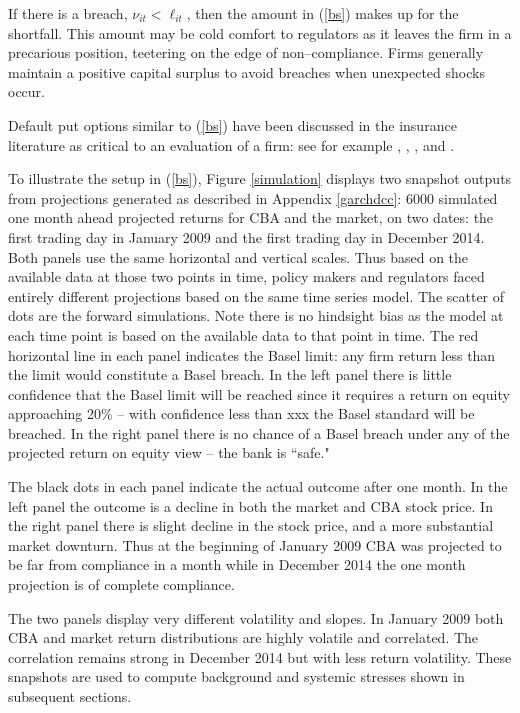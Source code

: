 \documentclass[12pt]{article}
\newcommand{\eref}[1]{(\ref{#1})}
\newcommand{\fref}[1]{Figure \ref{#1}}
\newcommand{\aref}[1]{Appendix \ref{#1}}
\begin{document}
If there is a breach, $\nu_{it}<\ell_{it}$, then the amount in \eref{bs} makes up for the shortfall.   This amount may be cold comfort to regulators as it leaves the firm in a precarious position, teetering on the edge of non--compliance. Firms generally maintain a positive capital surplus to avoid breaches when unexpected shocks occur.

Default put options similar to \eref{bs} have been discussed in the insurance literature as critical to an evaluation of a firm:  see for
example \citet{merton1977analytic}, \citet{doherty1986price}, \citet{cummins1988risk}, \citet{myers2001capital} and \citet{sherris2006solvency}.

To illustrate the setup in \eref{bs}, \fref{simulation}   displays two snapshot outputs from projections generated as described  in \aref{garchdcc}:  6000  simulated one month ahead projected returns for  CBA and the market, on  two dates: the first trading day in January 2009 and the first trading day in December 2014.    Both panels use the same horizontal and vertical scales.   Thus based on the available data at those two points in  time, policy makers and regulators faced entirely different projections based on the same time series model.   The scatter of dots are the forward simulations.  Note there is no hindsight bias as the model at each time point is based on the available data to that point in time.    The red horizontal line in each panel indicates the Basel limit:  any firm return less than the limit would constitute a Basel breach.   In the left panel there is little confidence that the Basel limit will be reached since it requires a return on equity approaching 20\% -- with confidence less than xxx the Basel standard will be breached.  In the right panel there is no chance of a Basel breach under any of the projected return on equity view -- the bank is ``safe."

 The black dots in each panel indicate the actual outcome after one month.    In the left panel the outcome is a decline in both  the market and CBA stock price.    In the right panel there is slight decline in the stock price, and a more substantial market downturn.    Thus at the beginning of January  2009 CBA was projected to be far from compliance in a month while in December 2014 the one month projection is of complete compliance.

 The two panels  display very different volatility and slopes. In January 2009 both CBA and market return distributions are highly volatile and correlated. The correlation remains strong in December 2014 but with less return volatility. These snapshots are used to compute background and systemic stresses shown in subsequent sections.
\end{document}
